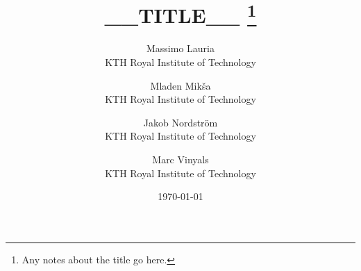 \documentclass[11pt,twoside,a4paper,notitlepage]{article}
\numberwithin{equation}{section}
\begin{document}
%
%

\title{__TITLE__%
  \thanks{Any notes about the title go here.}}

\author{%
  Massimo Lauria \\
  KTH Royal Institute of Technology
  \and
  Mladen Mik\v{s}a \\
  KTH Royal Institute of Technology
  \and
  Jakob Nordström \\
  KTH Royal Institute of Technology
  \and
  Marc Vinyals \\
  KTH Royal Institute of Technology}

\date{\today}

\maketitle

%
%

\thispagestyle{empty}

%


\pagestyle{fancy}
\fancyhead{}
\fancyfoot{}
\renewcommand{\headrulewidth}{0pt}
\renewcommand{\footrulewidth}{0pt}

%
%
\fancyhead[CO]{\slshape \nouppercase{\leftmark}}
\fancyfoot[C]{\thepage}

\setlength{\headheight}{13.6pt}
\end{document}
